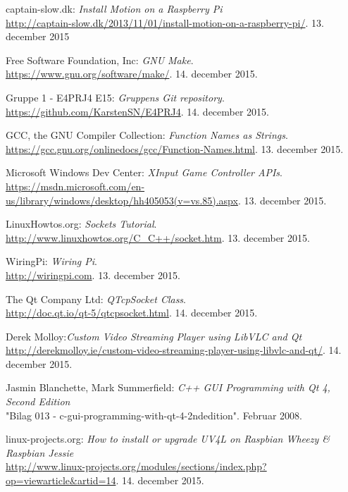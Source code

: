 \begin{thebibliography}{2}
captain-slow.dk: \textit{Install Motion on a Raspberry Pi} \\
\url{http://captain-slow.dk/2013/11/01/install-motion-on-a-raspberry-pi/}. 13. december 2015

 Free Software Foundation, Inc: \textit{GNU Make}. \\
\url{https://www.gnu.org/software/make/}. 14. december 2015.

 Gruppe 1 - E4PRJ4 E15: \textit{Gruppens Git repository}. \\
\url{https://github.com/KarstenSN/E4PRJ4}. 14. december 2015.

 GCC, the GNU Compiler Collection: \textit{Function Names as Strings}. \\
\url{https://gcc.gnu.org/onlinedocs/gcc/Function-Names.html}. 13. december 2015.

 Microsoft Windows Dev Center: \textit{XInput Game Controller APIs}. \\
\url{https://msdn.microsoft.com/en-us/library/windows/desktop/hh405053(v=vs.85).aspx}. 13. december 2015.

 LinuxHowtos.org: \textit{Sockets Tutorial}. \\
\url{http://www.linuxhowtos.org/C_C++/socket.htm}. 13. december 2015.

 WiringPi: \textit{Wiring Pi}. \\
\url{http://wiringpi.com}. 13. december 2015.

 The Qt Company Ltd: \textit{QTcpSocket Class}. \\
\url{http://doc.qt.io/qt-5/qtcpsocket.html}. 14. december 2015.

 Derek Molloy:\textit{Custom Video Streaming Player using LibVLC and Qt} \\
\url{http://derekmolloy.ie/custom-video-streaming-player-using-libvlc-and-qt/}. 14. december 2015.

 Jasmin Blanchette, Mark Summerfield: \textit{C++ GUI Programming with Qt 4, Second Edition} \\
"Bilag 013 - c-gui-programming-with-qt-4-2ndedition". Februar 2008.

 linux-projects.org: \textit{How to install or upgrade UV4L on Raspbian Wheezy \& Raspbian Jessie} \\
\url{http://www.linux-projects.org/modules/sections/index.php?op=viewarticle&artid=14}. 14. december 2015.


\end{thebibliography}
